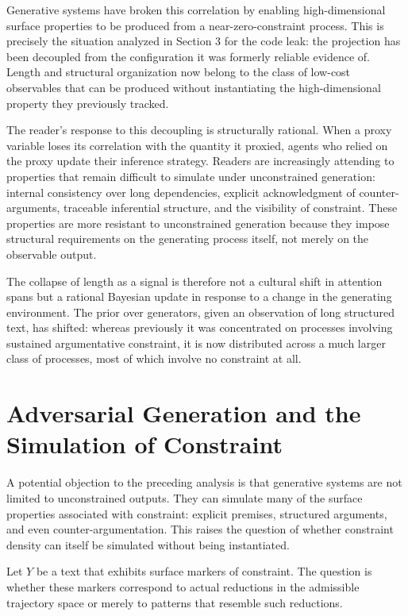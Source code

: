 \documentclass[12pt, oneside]{article}
\theoremstyle{plain}
\theoremstyle{definition}
\theoremstyle{remark}
\begin{document}
Generative systems have broken this correlation by enabling high-dimensional surface
properties to be produced from a near-zero-constraint process. This is precisely the
situation analyzed in Section 3 for the code leak: the projection has been decoupled from
the configuration it was formerly reliable evidence of. Length and structural organization
now belong to the class of low-cost observables that can be produced without instantiating
the high-dimensional property they previously tracked.

The reader's response to this decoupling is structurally rational. When a proxy variable
loses its correlation with the quantity it proxied, agents who relied on the proxy update
their inference strategy. Readers are increasingly attending to properties that remain
difficult to simulate under unconstrained generation: internal consistency over long
dependencies, explicit acknowledgment of counter-arguments, traceable inferential structure,
and the visibility of constraint. These properties are more resistant to unconstrained
generation because they impose structural requirements on the generating process itself,
not merely on the observable output.

The collapse of length as a signal is therefore not a cultural shift in attention spans
but a rational Bayesian update in response to a change in the generating environment. The
prior over generators, given an observation of long structured text, has shifted: whereas
previously it was concentrated on processes involving sustained argumentative constraint,
it is now distributed across a much larger class of processes, most of which involve no
constraint at all.

\section{Adversarial Generation and the Simulation of Constraint}

A potential objection to the preceding analysis is that generative systems are not
limited to unconstrained outputs. They can simulate many of the surface properties
associated with constraint: explicit premises, structured arguments, and even
counter-argumentation. This raises the question of whether constraint density can
itself be simulated without being instantiated.

Let $Y$ be a text that exhibits surface markers of constraint. The question is
whether these markers correspond to actual reductions in the admissible trajectory
space or merely to patterns that resemble such reductions.
\end{document}
